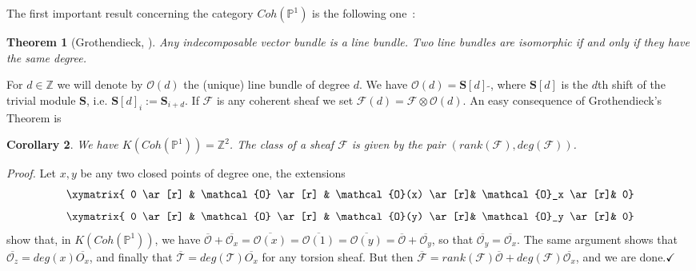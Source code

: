 \documentclass[a4paper,10pt]{amsart}
\def\Z{\mathbb{Z}}
\def\qed{$\hfill \checkmark$}
\def\O{\mathcal{O}}
\newtheorem{theo}{\bf{Theorem}}[section]
\newtheorem{cor}[theo]{Corollary}
\numberwithin{equation}{section}
\begin{document}
\vspace{.15in}

The first important result concerning the category $Coh(\mathbb{P}^1)$ is the following one~:

\vspace{.1in}

\begin{theo}[Grothendieck, \cite{Grot}]\label{P:GrothP1} Any indecomposable vector bundle is a line bundle.
Two line bundles are isomorphic if and only if they have the same degree.\end{theo}

\vspace{.1in}

For $d \in \Z$ we will denote by $\mathcal{O}(d)$ the (unique) line bundle of degree $d$. We have
$\mathcal{O}(d)=\mathbf{S}[d]\;\widetilde{}$, where $\mathbf{S}[d]$ is the $d$th shift of the trivial module $\mathbf{S}$, i.e. $\mathbf{S}[d]_i:=\mathbf{S}_{i+d}$. If $\mathcal{F}$ is any coherent sheaf we set $\mathcal{F}(d)=\mathcal{F} \otimes \mathcal{O}(d)$. An easy consequence of Grothendieck's Theorem is

\vspace{.1in}

\begin{cor} We have $K(Coh(\mathbb{P}^1))=\Z^2$. The class of a sheaf $\mathcal{F}$ is given by the pair $(rank(\mathcal{F}),deg(\mathcal{F}))$.\end{cor}

\noindent
\textit{Proof.} Let $x,y$ be any two closed points of degree one, the extensions
$$\xymatrix{ 0 \ar[r] & \mathcal{O} \ar[r] & \mathcal{O}(x) \ar[r]& \mathcal{O}_x \ar[r]& 0}$$
$$\xymatrix{ 0 \ar[r] & \mathcal{O} \ar[r] & \mathcal{O}(y) \ar[r]& \mathcal{O}_y \ar[r]& 0}$$
show that, in $K(Coh(\mathbb{P}^1))$, we have $\overline{\O}+\overline{\O_x} = \overline{\O(x)}=\overline{\O(1)}=\overline{\O(y)}=\overline{\O}+\overline{\O_y}$, so that
$\overline{\O_y}=\overline{\O_x}$. The same argument shows that $\overline{\mathcal{O}_z}=deg(x)\overline{O_{x}}$, and finally that $\overline{\mathcal{T}}=deg(\mathcal{T}) \overline{O_x}$ for any torsion sheaf. But then
$\overline{\mathcal{F}}=rank(\mathcal{F}) \overline{\O} + deg(\mathcal{F})\overline{\O_x}$, and we are done.\qed

\vspace{.15in}
\end{document}
